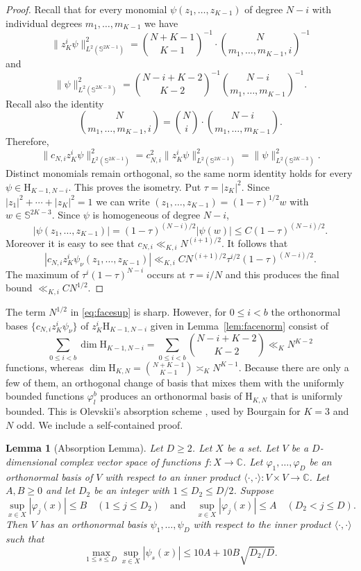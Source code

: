\documentclass[a4paper,reqno,12pt]{amsart}
\theoremstyle{plain}
\newtheorem{lemma}[theorem]{Lemma}
\theoremstyle{plain}
\theoremstyle{remark}
\theoremstyle{plain}
\renewcommand{\H}{\mathrm{H}}
\newcommand{\p}{\varphi}
\newcommand{\Sphere}{\mathbb{S}}
\theoremstyle{plain}
\theoremstyle{plain}
\begin{document}
{\begin{proof}
Recall that
for every monomial $\psi(z_1,{\ldots},z_{K-1})$ of degree $N-i$ with individual degrees $m_1, \ldots, m_{K - 1}$ we have
$$
\| z_K^i \psi \|^2_{L^2(\Sphere^{2K - 1})} = \binom{N + K - 1}{K - 1}^{-1} \cdot \binom{N}{m_1, \ldots, m_{K - 1}, i}^{-1}
$$
and
$$
\| \psi \|^2_{L^2(\Sphere^{2K - 3})} = \binom{N - i + K - 2}{K - 2}^{-1} \binom{N - i}{m_1, \ldots, m_{K - 1}}^{-1}.
$$
Recall also the identity
$$
\binom{N}{m_1, \ldots, m_{K - 1} , i} = \binom{N}{i} \cdot \binom{N -i }{m_1, \ldots, m_{K - 1}}.
$$
Therefore,
$$
\| c_{N,i} z^i_K \psi \|^2_{L^2(\Sphere^{2K - 1})} = c_{N,i}^2 \| z^i_K \psi \|_{L^2(\Sphere^{2K - 1})}^2 = \| \psi \|_{L^2(\Sphere^{2K - 3})}^2.
$$
Distinct monomials remain orthogonal, so the same norm identity holds
for every $\psi\in{\H_{K-1,N-i}}$. This proves the isometry. 
Put $\tau=|z_K|^2$. 
Since $|z_1|^2 + \cdots + |z_K|^2 = 1$ we can write 
$(z_1, \ldots, z_{K - 1}) = (1 - \tau)^{1/2} w$ with $w \in \mathbb{S}^{2K - 3}$.
Since $\psi$ is homogeneous of degree $N - i$, 
$$|\psi(z_1, \ldots, z_{K - 1})| = (1 - \tau)^{(N - i) / 2} |\psi(w)| \leq C (1 - \tau)^{(N - i) / 2}.$$ 
Moreover it is easy to see that $c_{N,i} \ll_{K,i} N^{(i + 1) / 2}$. It follows that
\[
| c_{N,i} z_K^i \psi_\nu(z_1,{\ldots},z_{K-1})|\ll_{K,i}  C N^{(i+1)/2} \tau^{i/2}(1-\tau)^{(N-i)/2}.
\]
The maximum of $\tau^i(1-\tau)^{N-i}$ occurs at $\tau=i/N$ and this produces the final bound  $\ll_{K,i} CN^{1/2}$.
\end{proof}
The term $N^{1/2}$ in \eqref{eq:facesup} is sharp. However, for
$0\le i<b$ the orthonormal bases $\{c_{N,i}z_K^i\psi_\nu\}$ of
$z_K^i\H_{K-1,N-i}$ given in Lemma~\ref{lem:facenorm} consist of
\[
\sum_{0\le i<b}\dim\H_{K-1,N-i}
=\sum_{0\le i<b}\binom{N-i+K-2}{K-2}\ll_K N^{K-2}
\]
functions, whereas $\dim\H_{K,N}=\binom{N+K-1}{K-1}\asymp_K N^{K-1}$.
Because there are only a few of them, an orthogonal change of basis that mixes them with the uniformly bounded functions $\p^b_{l}$ produces an orthonormal basis of $\H_{K,N}$ that is uniformly bounded. This is Olevskii's
absorption scheme \cite{Olv1}, used by Bourgain \cite[Section~3]{Bour2}
for $K=3$ and $N$ odd. We include a self-contained proof. 

\begin{lemma}[Absorption Lemma]\label{lem:absorption}
Let $D \geq 2$. Let $X$ be a set. Let $V$ be a $D$-dimensional complex vector space
of functions $f: X\to\mathbb C$.
Let $\p_1,{\ldots},\p_D$ be an orthonormal
basis of $V$ with respect to an inner product $\langle \cdot, \cdot \rangle : V \times V \rightarrow \mathbb{C}$. Let $A,B\ge0$ and let $D_2$ be an integer with
$1\le D_2\le D/2$. Suppose
\[
\sup_{x \in X} |\p_j(x)| \leq B \quad(1\le j\le D_2)
{\quad \text{and} \quad}
\sup_{x \in X} |\p_j(x)| \le A \quad(D_2<j\le D).
\]
Then $V$ has an orthonormal basis $\psi_1,{\ldots},\psi_D$ with respect to 
the inner product $\langle \cdot, \cdot \rangle$ such that
\[
\max_{1\le s\le D} \sup_{x \in X} |\psi_s(x)|
\le 10A+10B\sqrt{D_2/D}.
\]
\end{lemma}

}
\end{document}

